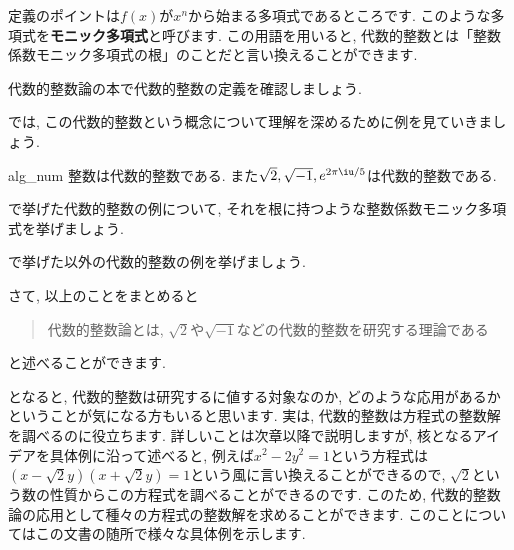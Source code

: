 \documentclass[11pt,b5paper,oneside,titlepage,lualatex]{ltjsreport}
\begin{document}
定義のポイントは$ f(x) $が$ x^n $から始まる多項式であるところです. 
このような多項式を\textbf{モニック多項式}と呼びます. 
この用語を用いると, 代数的整数とは「整数係数モニック多項式の根」のことだと言い換えることができます. 

\begin{exc}{}{}
	代数的整数論の本で代数的整数の定義を確認しましょう. 
\end{exc}

では, この代数的整数という概念について理解を深めるために例を見ていきましょう. 

\begin{ex}{}{alg_num}
	整数は代数的整数である. また$ \sqrt{2}, \sqrt{-1}, e^{2\pi \iu/5} $は代数的整数である. 
\end{ex}

\begin{exc}{}{}
	で挙げた代数的整数の例について, それを根に持つような整数係数モニック多項式を挙げましょう. 
\end{exc}

\begin{exc}{}{}
	で挙げた以外の代数的整数の例を挙げましょう. 
\end{exc}

さて, 以上のことをまとめると
\begin{quote}
	\centering
	代数的整数論とは, $ \sqrt{2} $や$ \sqrt{-1} $などの代数的整数を研究する理論である
\end{quote}
と述べることができます. 

となると, 代数的整数は研究するに値する対象なのか, どのような応用があるかということが気になる方もいると思います. 
実は, 代数的整数は方程式の整数解を調べるのに役立ちます. 
詳しいことは次章以降で説明しますが, 核となるアイデアを具体例に沿って述べると, 例えば$ x^2 - 2y^2 = 1 $という方程式は
$  \left(x - \sqrt{2}y \right) \left(x + \sqrt{2}y \right) = 1 $という風に言い換えることができるので, $ \sqrt{2} $という数の性質からこの方程式を調べることができるのです. 
このため, 代数的整数論の応用として種々の方程式の整数解を求めることができます. 
このことについてはこの文書の随所で様々な具体例を示します. 


\end{document}
